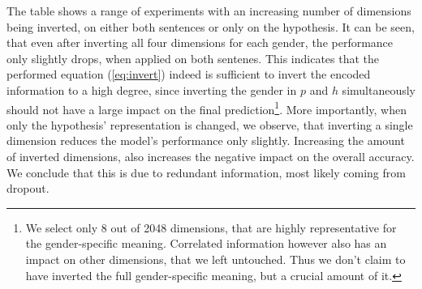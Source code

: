 The table shows a range of experiments with an increasing number of dimensions being inverted, on either both sentences or only on the hypothesis. It can be seen, that even after inverting all four dimensions for each gender, the performance only slightly drops, when applied on both sentenes. This indicates that the performed equation (\ref{eq:invert}) indeed is sufficient to invert the encoded information to a high degree, since inverting the gender in $p$ and $h$ simultaneously should not have a large impact on the final prediction\footnote{We select only 8 out of 2048 dimensions, that are highly representative for the gender-specific meaning. Correlated information however also has an impact on other dimensions, that we left untouched. Thus we don't claim to have inverted the full gender-specific meaning, but a crucial amount of it.}. More importantly, when only the hypothesis' representation is changed, we observe, that inverting a single dimension reduces the model's performance only slightly. Increasing the amount of inverted dimensions, also increases the negative impact on the overall accuracy. We conclude that this is due to redundant information, most likely coming from dropout. 
